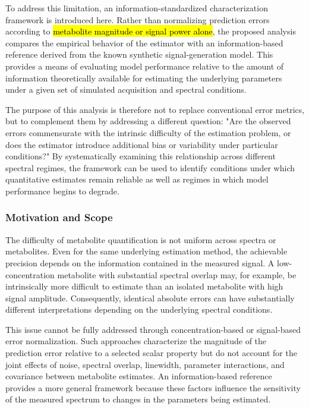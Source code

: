 To address this limitation, an information-standardized characterization framework is introduced here. Rather than normalizing prediction errors according to \textcolor{violet}{\hl{metabolite magnitude or signal power alone}}, the proposed analysis compares the empirical behavior of the \DL estimator with an information-based reference derived from the known synthetic signal-generation model. This provides a means of evaluating model performance relative to the amount of information theoretically available for estimating the underlying parameters under a given set of simulated acquisition and spectral conditions.

The purpose of this analysis is therefore not to replace conventional error metrics, but to complement them by addressing a different question: "Are the observed errors commensurate with the intrinsic difficulty of the estimation problem, or does the \DL estimator introduce additional bias or variability under particular conditions?" By systematically examining this relationship across different spectral regimes, the framework can be used to identify conditions under which quantitative estimates remain reliable as well as regimes in which model performance begins to degrade.

\subsubsection{Motivation and Scope}
\label{sec:Analy&Visual:subsec:infoStand:subsubsec:}
The difficulty of metabolite quantification is not uniform across spectra or metabolites. Even for the same underlying estimation method, the achievable precision depends on the information contained in the measured signal. A low-concentration metabolite with substantial spectral overlap may, for example, be intrinsically more difficult to estimate than an isolated metabolite with high signal amplitude. Consequently, identical absolute errors can have substantially different interpretations depending on the underlying spectral conditions.

This issue cannot be fully addressed through concen\-tration-based or signal-based error normalization. Such approaches characterize the magnitude of the prediction error relative to a selected scalar property but do not account for the joint effects of noise, spectral overlap, linewidth, parameter interactions, and covariance between metabolite estimates. An information-based reference provides a more general framework because these factors influence the sensitivity of the measured spectrum to changes in the parameters being estimated.

